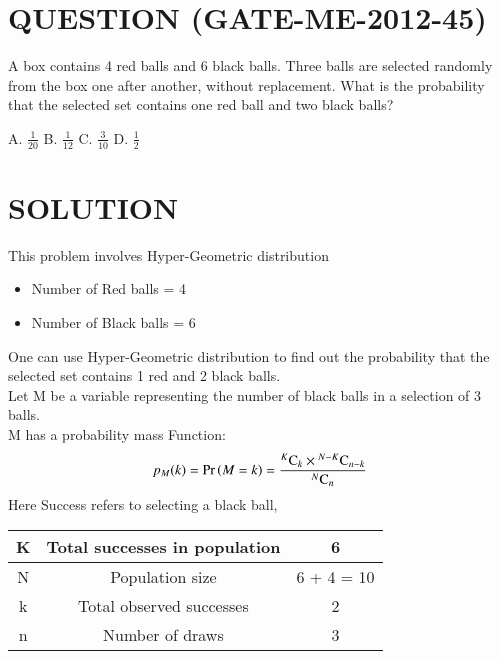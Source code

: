 \documentclass[journal,12pt,twocolumn]{IEEEtran}
\begin{document}
\section*{QUESTION (GATE-ME-2012-45)}
A box contains 4 red balls and 6 black balls. Three balls are selected randomly from the box one after another, 
without replacement. What is the probability that the selected set contains one red ball and two black balls?
\begin{center}
    A. $\displaystyle{\frac{1}{20}}$ \hspace{0.5cm}B. $\displaystyle{\frac{1}{12}}$ \hspace{0.5cm}C. $\displaystyle{\frac{3}{10}}$ \hspace{0.5cm}D. $\displaystyle{\frac{1}{2}}$
\end{center}
\section*{SOLUTION}
This problem involves Hyper-Geometric distribution
\bigskip
\begin{itemize}
    \item Number of Red balls = 4
    \item Number of Black balls = 6
\end{itemize}
\bigskip
One can use Hyper-Geometric distribution to find out the probability that the selected set contains 1 red and 2 black balls.\\
Let M be a variable representing the number of black balls in a selection of 3 balls.\\
M has a probability mass Function:
\begin{equation}
    p_M(k) = \Pr\left(M = k\right) = \frac{{}^{K}\mathrm{C}_{k} \times {}^{N-K}\mathrm{C}_{n-k}}{{}^{N}\mathrm{C}_{n}}
\end{equation}
Here Success refers to selecting a black ball,
\begin{table}[H]
    \begin{center}
        \resizebox{!}{!}
        {
            \begin{tabular}{|c|c|c|}
                \hline
                K & Total successes in population & 6\\
                \hline
                N & Population size & 6 + 4 = 10\\
                \hline
                k & Total observed successes & 2\\
                \hline
                n & Number of draws & 3\\
                \hline
            \end{tabular}
        }
    \end{center}
\end{table}
\end{document}
